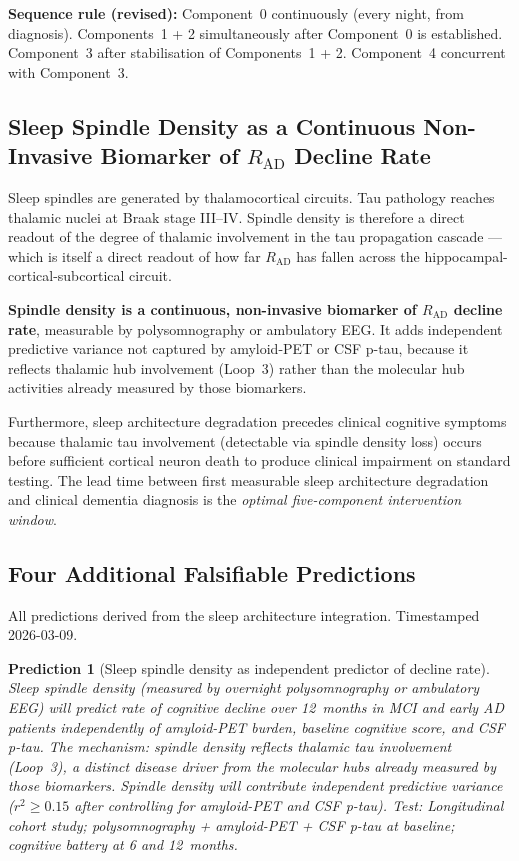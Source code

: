\documentclass[12pt,a4paper]{article}
\newtheorem{prediction}{Prediction}
\newcommand{\RAD}{R_{\mathrm{AD}}}
\begin{document}
\textbf{Sequence rule (revised):} Component~0
continuously (every night, from diagnosis).
Components~1 + 2 simultaneously after Component~0
is established. Component~3 after stabilisation of
Components~1 + 2. Component~4 concurrent with
Component~3.

\subsection{Sleep Spindle Density as a Continuous
Non-Invasive Biomarker of $\RAD$ Decline Rate}

Sleep spindles are generated by thalamocortical
circuits. Tau pathology reaches thalamic nuclei at
Braak stage III--IV. Spindle density is therefore a
direct readout of the degree of thalamic involvement
in the tau propagation cascade --- which is itself
a direct readout of how far $\RAD$ has fallen across
the hippocampal-cortical-subcortical circuit.

\textbf{Spindle density is a continuous, non-invasive
biomarker of $\RAD$ decline rate}, measurable by
polysomnography or ambulatory EEG. It adds independent
predictive variance not captured by amyloid-PET or
CSF p-tau, because it reflects thalamic hub involvement
(Loop~3) rather than the molecular hub activities
already measured by those biomarkers.

Furthermore, sleep architecture degradation precedes
clinical cognitive symptoms because thalamic tau
involvement (detectable via spindle density loss)
occurs before sufficient cortical neuron death to
produce clinical impairment on standard testing. The
lead time between first measurable sleep architecture
degradation and clinical dementia diagnosis is the
\emph{optimal five-component intervention window}.

\subsection{Four Additional Falsifiable Predictions}

All predictions derived from the sleep architecture
integration. Timestamped 2026-03-09.

\begin{prediction}[Sleep spindle density as
independent predictor of decline rate]
\label{pred:spindle}
Sleep spindle density (measured by overnight
polysomnography or ambulatory EEG) will predict
rate of cognitive decline over 12~months in MCI
and early AD patients independently of amyloid-PET
burden, baseline cognitive score, and CSF p-tau.
The mechanism: spindle density reflects thalamic
tau involvement (Loop~3), a distinct disease driver
from the molecular hubs already measured by those
biomarkers. Spindle density will contribute
independent predictive variance ($r^2 \geq 0.15$
after controlling for amyloid-PET and CSF p-tau).
\textit{Test:} Longitudinal cohort study;
polysomnography + amyloid-PET + CSF p-tau at
baseline; cognitive battery at 6 and 12~months.
\end{prediction}
\end{document}
